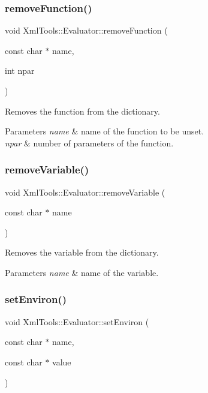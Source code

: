 \subsubsection{\texorpdfstring{remove\+Function()}{removeFunction()}}
{\footnotesize\ttfamily void Xml\+Tools\+::\+Evaluator\+::remove\+Function (\begin{DoxyParamCaption}\item[{const char $\ast$}]{name,  }\item[{int}]{npar }\end{DoxyParamCaption})}

Removes the function from the dictionary.


\begin{DoxyParams}{Parameters}
{\em name} & name of the function to be unset. \\
\hline
{\em npar} & number of parameters of the function. \\
\hline
\end{DoxyParams}
\hypertarget{class_xml_tools_1_1_evaluator_a1fbc17d2bdbda88525e309098ba52563}{}\label{class_xml_tools_1_1_evaluator_a1fbc17d2bdbda88525e309098ba52563} 
\subsubsection{\texorpdfstring{remove\+Variable()}{removeVariable()}}
{\footnotesize\ttfamily void Xml\+Tools\+::\+Evaluator\+::remove\+Variable (\begin{DoxyParamCaption}\item[{const char $\ast$}]{name }\end{DoxyParamCaption})}

Removes the variable from the dictionary.


\begin{DoxyParams}{Parameters}
{\em name} & name of the variable. \\
\hline
\end{DoxyParams}
\hypertarget{class_xml_tools_1_1_evaluator_a3329d0bef31237642ed7d5ca53d9d167}{}\label{class_xml_tools_1_1_evaluator_a3329d0bef31237642ed7d5ca53d9d167} 
\subsubsection{\texorpdfstring{set\+Environ()}{setEnviron()}}
{\footnotesize\ttfamily void Xml\+Tools\+::\+Evaluator\+::set\+Environ (\begin{DoxyParamCaption}\item[{const char $\ast$}]{name,  }\item[{const char $\ast$}]{value }\end{DoxyParamCaption})}

